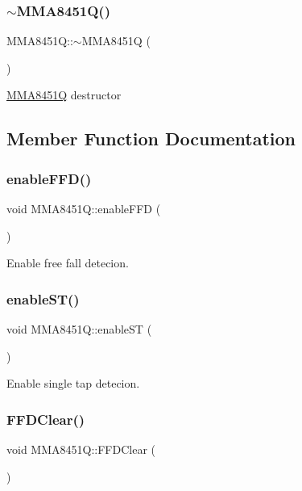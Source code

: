 \subsubsection{\texorpdfstring{$\sim$\+M\+M\+A8451\+Q()}{~MMA8451Q()}}
{\footnotesize\ttfamily M\+M\+A8451\+Q\+::$\sim$\+M\+M\+A8451Q (\begin{DoxyParamCaption}{ }\end{DoxyParamCaption})}

\hyperlink{classMMA8451Q}{M\+M\+A8451Q} destructor 

\subsection{Member Function Documentation}
\mbox{\label{classMMA8451Q_ac0b192ecf6a7e799de50cb90e4f36e26}} 
\subsubsection{\texorpdfstring{enable\+F\+F\+D()}{enableFFD()}}
{\footnotesize\ttfamily void M\+M\+A8451\+Q\+::enable\+F\+FD (\begin{DoxyParamCaption}{ }\end{DoxyParamCaption})}

Enable free fall detecion. \mbox{\label{classMMA8451Q_a5d140cede4acca028ae1b46e59b32454}} 
\subsubsection{\texorpdfstring{enable\+S\+T()}{enableST()}}
{\footnotesize\ttfamily void M\+M\+A8451\+Q\+::enable\+ST (\begin{DoxyParamCaption}{ }\end{DoxyParamCaption})}

Enable single tap detecion. \mbox{\label{classMMA8451Q_a068f21143998cbe01f3e4cfb41c454d7}} 
\subsubsection{\texorpdfstring{F\+F\+D\+Clear()}{FFDClear()}}
{\footnotesize\ttfamily void M\+M\+A8451\+Q\+::\+F\+F\+D\+Clear (\begin{DoxyParamCaption}{ }\end{DoxyParamCaption})}

